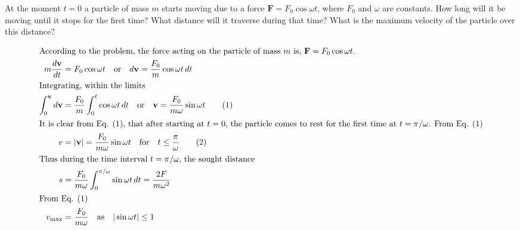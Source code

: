 \item At the moment \( t = 0 \) a particle of mass \( m \) starts moving due to a force \( \mathbf{F} = F_0 \cos \omega t \), where \( F_0 \) and \( \omega \) are constants. How long will it be moving until it stops for the first time? What distance will it traverse during that time? What is the maximum velocity of the particle over this distance?\begin{solution}
    
    \begin{align*}
        \intertext{According to the problem, the force acting on the particle of mass $m$ is, $\mathbf{F} = F_0 \cos \omega t$.}
        m \dfrac{d\mathbf{v}}{dt} &= F_0 \cos \omega t \quad \text{or} \quad d\mathbf{v} = \dfrac{F_0}{m} \cos \omega t \, dt\\
        \intertext{Integrating, within the limits}
        \int_0^\mathbf{v} d\mathbf{v} &= \dfrac{F_0}{m} \int_0^t \cos \omega t \, dt \quad \text{or} \quad \mathbf{v} = \dfrac{F_0}{m \omega} \sin \omega t \tag{1}\\
        \intertext{It is clear from Eq. (1), that after starting at $t = 0$, the particle comes to rest for the first time at $t = \pi / \omega$. From Eq. (1)}
        v &= |\mathbf{v}| = \dfrac{F_0}{m \omega} \sin \omega t \quad \text{for} \quad t \leq \dfrac{\pi}{\omega} \tag{2}\\
        \intertext{Thus during the time interval $t = \pi/\omega$, the sought distance}
        s &= \dfrac{F_0}{m \omega} \int_0^{\pi/\omega} \sin \omega t \, dt = \dfrac{2 F}{m \omega^2}\\
        \intertext{From Eq. (1)}
        v_{\max} &= \dfrac{F_0}{m \omega} \quad \text{as} \quad |\sin \omega t| \leq 1
    \end{align*}
\end{solution}